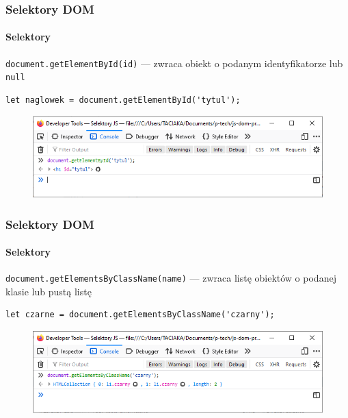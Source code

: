 \begin{frame}[fragile]
  \frametitle{Selektory DOM}
  \framesubtitle{Selektory}

  \verb|document.getElementById(id)| --- zwraca obiekt o podanym identyfikatorze lub \verb|null|

  \begin{verbatim}
let naglowek = document.getElementById('tytul');
  \end{verbatim}

  \begin{figure}
    \includegraphics[scale=0.55]{images/dom-selector-getelementbyid}
  \end{figure}

\end{frame}


\begin{frame}[fragile]
  \frametitle{Selektory DOM}
  \framesubtitle{Selektory}

  \verb|document.getElementsByClassName(name)| --- zwraca listę obiektów o podanej klasie lub pustą listę

  \begin{verbatim}
let czarne = document.getElementsByClassName('czarny');
  \end{verbatim}

  \begin{figure}
    \includegraphics[scale=0.55]{images/dom-selector-getelementsbyclassname}
  \end{figure}

\end{frame}


